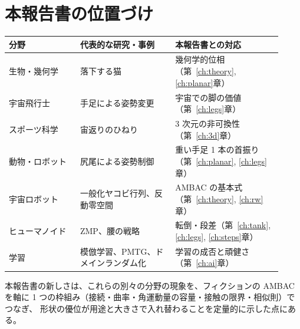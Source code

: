 \section{本報告書の位置づけ}

\begin{longtable}{p{0.24\linewidth}p{0.32\linewidth}p{0.36\linewidth}}
\toprule
分野 & 代表的な研究・事例 & 本報告書との対応 \\ \midrule \endhead
生物・幾何学 & 落下する猫 \cite{R7,R4} & 幾何学的位相（第~\ref{ch:theory}, \ref{ch:planar}章） \\
宇宙飛行士 & 手足による姿勢変更 \cite{R8,R43,R44} & 宇宙での脚の価値（第~\ref{ch:legs}章） \\
スポーツ科学 & 宙返りのひねり \cite{R46} & 3 次元の非可換性（第~\ref{ch:3d}章） \\
動物・ロボット & 尻尾による姿勢制御 \cite{R45} & 重い手足 1 本の首振り（第~\ref{ch:planar}, \ref{ch:legs}章） \\
宇宙ロボット & 一般化ヤコビ行列、反動零空間 \cite{R14,R15} & AMBAC の基本式（第~\ref{ch:theory}, \ref{ch:rw}章） \\
ヒューマノイド & ZMP、腰の戦略 \cite{R28,R31} & 転倒・段差（第~\ref{ch:tank}, \ref{ch:legs}, \ref{ch:steps}章） \\
学習 & 模倣学習、PMTG、ドメインランダム化 \cite{R24,R21,R23} & 学習の成否と頑健さ（第~\ref{ch:ai}章） \\
\bottomrule
\end{longtable}

本報告書の新しさは、これらの別々の分野の現象を、フィクションの AMBAC を軸に 1 つの枠組み（接続・曲率・角運動量の容量・接触の限界・相似則）でつなぎ、
形状の優位が用途と大きさで入れ替わることを定量的に示した点にある。
